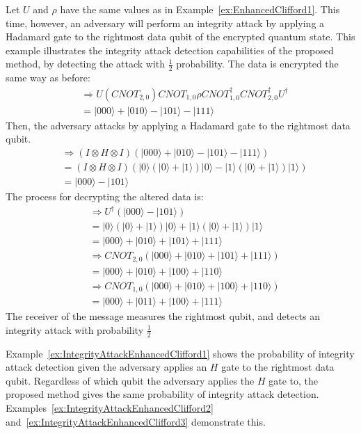 \begin{example}
\label{ex:IntegrityAttackEnhancedClifford1}
	Let $U$ and $\rho$ have the same values as in Example~\ref{ex:EnhancedClifford1}. This time, however, an adversary will perform an integrity attack by applying a Hadamard gate to the rightmost data qubit of the encrypted quantum state. This example illustrates the integrity attack detection capabilities of the proposed method, by detecting the attack with $\frac{1}{2}$ probability. The data is encrypted the same way as before:
	\begin{align}
	& \Rightarrow U (\mathit{CNOT}_{2,0})\mathit{CNOT}_{1,0}\rho \mathit{CNOT}_{1,0}^{\dagger}\mathit{CNOT}_{2,0}^{\dagger} U^{\dagger}\\
	&= |000\rangle + |010\rangle - |101\rangle - |111\rangle
	\end{align}
	Then, the adversary attacks by applying a Hadamard gate to the rightmost data qubit.
	\begin{align}
	& \Rightarrow (I \otimes H \otimes I)(|000\rangle + |010\rangle - |101\rangle - |111\rangle)\\
	& = (I \otimes H \otimes I)(|0\rangle(|0\rangle + |1\rangle)|0\rangle - |1\rangle(|0\rangle + |1\rangle)|1\rangle)\\
	&= |000\rangle - |101\rangle
	\end{align}
	The process for decrypting the altered data is:
	\begin{align}
	& \Rightarrow U^{\dagger}(|000\rangle - |101\rangle)\\
	&= |0\rangle(|0\rangle + |1\rangle)|0\rangle + |1\rangle(|0\rangle + |1\rangle)|1\rangle\\
	&= |000\rangle + |010\rangle + |101\rangle + |111\rangle\\ 
	& \Rightarrow \mathit{CNOT}_{2,0} (|000\rangle + |010\rangle + |101\rangle + |111\rangle)\\
	&= |000\rangle + |010\rangle + |100\rangle + |110\rangle\\
	& \Rightarrow \mathit{CNOT}_{1,0} (|000\rangle + |010\rangle + |100\rangle + |110\rangle)\\
	&= |000\rangle + |011\rangle + |100\rangle + |111\rangle
	\end{align}
The receiver of the message measures the rightmost qubit, and detects an integrity attack with probability $\frac{1}{2}$
\end{example}
Example~\ref{ex:IntegrityAttackEnhancedClifford1} shows the probability of integrity attack detection given the adversary applies an $H$ gate to the rightmost data qubit. Regardless of which qubit the adversary applies the $H$ gate to, the proposed method gives the same probability of integrity attack detection. Examples~\ref{ex:IntegrityAttackEnhancedClifford2} and~\ref{ex:IntegrityAttackEnhancedClifford3} demonstrate this.

